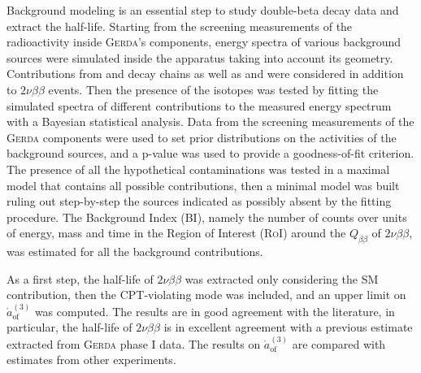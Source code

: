 \documentclass[11pt, a4paper]{article}
\newcommand{\aof}{\mathring{a}_\text{of}^{(3)}}
\begin{document}
Background modeling is an essential step to study double-beta decay data and extract the half-life. Starting from the screening measurements of the radioactivity inside \textsc{Gerda}'s components, energy spectra of various background sources were simulated inside the apparatus taking into account its geometry. Contributions from  and  decay chains as well as  and  were considered in addition to $2\nu\beta\beta$ events. Then the presence of the isotopes was tested by fitting the simulated spectra of different contributions to the measured energy spectrum with a Bayesian statistical analysis. Data from the screening measurements of the \textsc{Gerda} components were used to set prior distributions on the activities of the background sources, and a p-value was used to provide a goodness-of-fit criterion. The presence of all the hypothetical contaminations was tested in a maximal model that contains all possible contributions, then a minimal model was built ruling out step-by-step the sources indicated as possibly absent by the fitting procedure. The Background Index (BI), namely the number of counts over units of energy, mass and time in the Region of Interest (\textsc{RoI}) around the $Q_{\beta\beta}$ of $2\nu\beta\beta$, was estimated for all the background contributions.

As a first step, the half-life of $2\nu\beta\beta$ was extracted only considering the SM contribution, then the CPT-violating mode was included, and an upper limit on $\aof$ was computed. The results are in good agreement with the literature, in particular, the half-life of $2\nu\beta\beta$ is in excellent agreement with a previous estimate extracted from \textsc{Gerda} phase I data. The results on $\aof$ are compared with estimates from other experiments.
\end{document}
